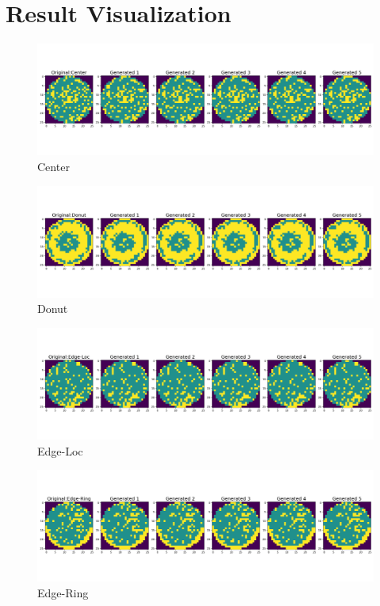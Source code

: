 \documentclass[a4paper, 10]{article}
\begin{document}
\section{Result Visualization}
    \begin{figure}[H]
        \centering
        \includegraphics[width=\textwidth]{Center.png}
        \caption{Center} \label{fig:4}
    \end{figure}
    \begin{figure}[H]
        \centering
        \includegraphics[width=\textwidth]{Donut.png}
        \caption{Donut} \label{fig:5}
    \end{figure}
    \begin{figure}[H]
        \centering
        \includegraphics[width=\textwidth]{Edge-Loc.png}
        \caption{Edge-Loc} \label{fig:6}
    \end{figure}
    \begin{figure}[H]
        \includegraphics[width=\textwidth]{Edge-Ring.png}
        \centering
        \caption{Edge-Ring} \label{fig:7}
    \end{figure}
\end{document}
